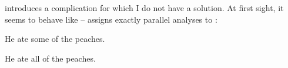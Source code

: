 \documentclass[11pt,a4paper]{article}
\begin{document}
\begin{figure}[ht]
\begin{minipage}[t]{0.45\linewidth}
{{   }
}
\end{minipage}
\hspace*{\fill}
\caption{}\label{he ate some of the peaches .}
\end{figure}

 introduces a complication for which I do not have a
solution. At first sight, it seems to behave like  --
 assigns exactly parallel analyses to :

\begin{examples}
\item \label{SOME/ALL}
\begin{examples}
\item
He ate some of the peaches.
\item
He ate all of the peaches.
\end{examples}
\end{examples}
\end{document}
